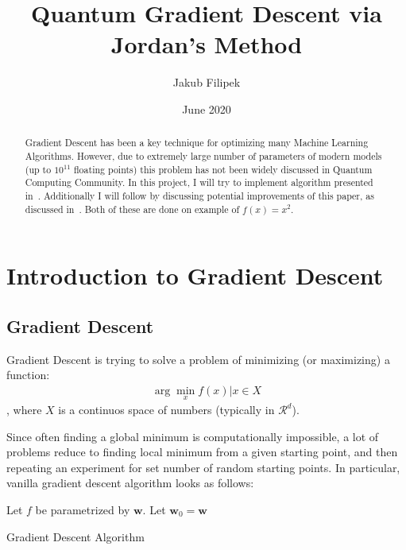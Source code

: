 \documentclass{article}
\title{Quantum Gradient Descent via Jordan's Method}
\author{Jakub Filipek}
\date{June 2020}
\begin{document}
\maketitle

\begin{abstract}
    \noindent Gradient Descent has been a key technique for optimizing many Machine Learning Algorithms.
    However, due to extremely large number of parameters of modern models (up to $10^{11}$ floating points)
    this problem has not been widely discussed in Quantum Computing Community.
    In this project, I will try to implement algorithm presented in~\cite{Jordan_2005}.
    Additionally I will follow by discussing potential improvements of this paper, as discussed in~\cite{Gily_n_2019}.
    Both of these are done on example of $f(x) = x^2$.
\end{abstract}


\section{Introduction to Gradient Descent}
\label{sec:intro-grad-desc}

\subsection{Gradient Descent}
\label{subsec:grad-desc}
Gradient Descent is trying to solve a problem of minimizing (or maximizing) a function:
\begin{align}
    \arg \min \limits_x f(x) | x \in X
\end{align}, where $X$ is a continuos space of numbers (typically in $\mathcal{R}^d$).

Since often finding a global minimum is computationally impossible, a lot of problems reduce to finding local minimum from a given starting point,
and then repeating an experiment for set number of random starting points. In particular, vanilla gradient descent algorithm looks as follows:

\begin{algorithm}[H]
    \SetAlgoLined
    Let $f$ be parametrized by $\pmb{w}$. \;
    Let $\pmb{w}_0 = \pmb{w}$ \;
    \caption{Gradient Descent Algorithm}
    \label{alg:vanilla-grad-desc}
\end{algorithm}
\end{document}
